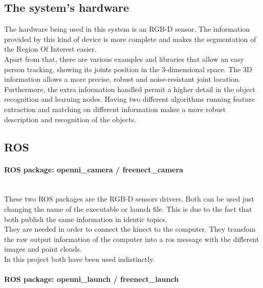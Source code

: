 		\subsection{The system's hardware}

		The hardware being used in this system is an RGB-D sensor. The information provided by this kind of device is more complete and makes the segmentation of the Region Of Interest easier. 
		\\

		Apart from that, there are various examples and libraries that allow an easy person tracking, showing its joints position in the 3-dimensional space. The 3D information allows a more precise, robust and noise-resistant joint location.
		\\

		Furthermore, the extra information handled permit a higher detail in the object recognition and learning nodes. Having two different algorithms running feature extraction and matching on different information makes a more robust description and recognition of the objects. 



	\subsection{ROS}

		\paragraph{ROS package: openni\_camera / freenect\_camera}\mbox{} \\

		These two ROS packages are the RGB-D sensors drivers. Both can be used just changing the name of the executable or launch file. This is due to the fact that both publish the same information in identic topics. 
		\\

		They are needed in order to connect the kinect to the computer. They transfom the raw output information of the computer into a ros message with the different images and point clouds. 
		\\

		In this project both have been used indistinctly.  

		\paragraph{ROS package: openni\_launch / freenect\_launch}\mbox{} \\

